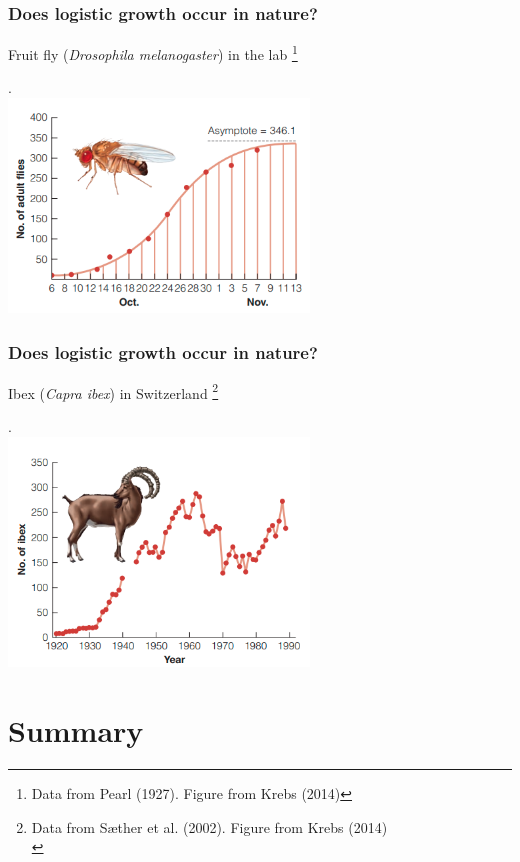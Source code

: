 \documentclass[color=usenames,dvipsnames]{beamer}\usepackage[]{graphicx}\usepackage[]{xcolor}
\newcommand\blfootnote[1]{%
  \begingroup
  \renewcommand\thefootnote{}\footnote{#1}%
  \addtocounter{footnote}{-1}%
  \endgroup
}
\begin{document}
\begin{frame}
  \frametitle{Does logistic growth occur in nature?}
  Fruit fly ({\it Drosophila melanogaster}) in the lab\blfootnote{\tiny
    \flushleft
    Data from Pearl (1927). Figure from Krebs (2014) %
  }. \\
  \vfill
  \centering
  \includegraphics[width=0.6\textwidth]{figs/logistic-drosophila}
\end{frame}





\begin{frame}
  \frametitle{Does logistic growth occur in nature?}
  Ibex ({\it Capra ibex}) in Switzerland\blfootnote{\tiny
    \flushleft
    Data from S{\ae}ther et al. (2002). Figure from Krebs (2014) \\
  }. \\
  \vfill
  \centering
  \includegraphics[width=0.6\textwidth]{figs/logistic-ibex}\\
\end{frame}





\section{Summary}
\end{document}
